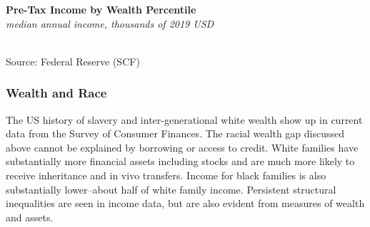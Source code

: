 \documentclass{report}
\makeatletter
\newcommand{\tbllink}[1]{\href{https://raw.githubusercontent.com/bdecon/US-chartbook/master/chartbook/data/#1}{\faTable}}
\newcommand*\short[1]{\expandafter\@gobbletwo\number\numexpr#1\relax}
\newcommand{\stdnode}[3]{\node[below, align=left, shift=({#1,#2})]{#3};}
\newcommand{\shdateaxisticks}{
		date coordinates in=x, axis line style={draw=none},
		xmax={2023-11-01},
		max space between ticks=40,	    
		xtick={{1990-01-01}, {1995-01-01}, {2000-01-01}, 
			{2005-01-01}, {2010-01-01}, {2015-01-01}, {2020-01-01}},
		minor xtick={},
		enlarge y limits={0.06}, enlarge x limits={0.01},
		}
\newcommand{\bbar}[2]{extra #1 ticks = {{#2}}, extra #1 tick labels = ,
		extra #1 tick style = {grid=major, grid style={thick, black!25}},}
\newcommand{\stdline}[4]{\addplot[very thick, no markers, color=#1] 
		table [x=#2, y=#3, col sep=comma] {#4};	}
\newcommand{\rbars}{
		\fill[color=black!10] (axis cs:{1990-07-01},\pgfkeysvalueof{/pgfplots/ymin}) rectangle 
			(axis cs:{1991-03-01}, \pgfkeysvalueof{/pgfplots/ymax});
		\fill[color=black!10] (axis cs:{2007-12-01},\pgfkeysvalueof{/pgfplots/ymin}) rectangle 
			(axis cs:{2009-07-01}, \pgfkeysvalueof{/pgfplots/ymax});
		\fill[color=black!10] (axis cs:{2001-03-01},\pgfkeysvalueof{/pgfplots/ymin}) rectangle 
			(axis cs:{2001-11-01}, \pgfkeysvalueof{/pgfplots/ymax});
		\fill[color=black!10] (axis cs:{2020-02-01},\pgfkeysvalueof{/pgfplots/ymin}) rectangle 
			(axis cs:{2020-05-01}, \pgfkeysvalueof{/pgfplots/ymax});}
\makeatother
\begin{document}
{\begin{minipage}{0.425\textwidth}
\normalsize \textbf{Pre-Tax Income by Wealth Percentile}\\
\footnotesize{\textit{median annual income, thousands of 2019 USD}}\\
\hspace*{-1mm} \\
\footnotesize{Source: Federal Reserve (SCF)} \hfill \tbllink{scfwealthmedian.csv} \ \ 
\end{minipage}\hspace{6mm}
\begin{minipage}{0.29\textwidth}
\small 
\end{minipage}
\newpage
\begin{minipage}{0.76\textwidth}   
\subsubsection*{Wealth and Race}
\small The US history of slavery and inter-generational white wealth show up in current data from the Survey of Consumer Finances. The racial wealth gap discussed above cannot be explained by borrowing or access to credit. White families have substantially more financial assets including stocks and are much more likely to receive inheritance and in vivo transfers. Income for black families is also substantially lower--about half of white family income. Persistent structural inequalities are seen in income data, but are also evident from measures of wealth and assets.
\vspace{1mm}


\end{minipage}}
\end{document}
